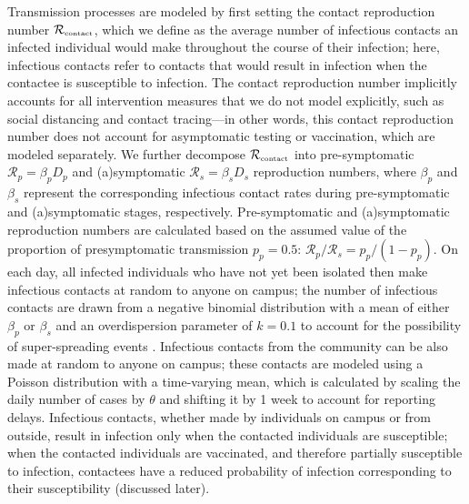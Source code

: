 \documentclass[12pt]{article}
\newcommand{\Rx}[1]{\ensuremath{{\mathcal R}_{#1}}}
\newcommand{\Rc}{\Rx{\textrm{\tiny{contact}}}}
\begin{document}
Transmission processes are modeled by first setting the contact reproduction number $\Rc$, which we define as the average number of infectious contacts an infected individual would make throughout the course of their infection;
here, infectious contacts refer to contacts that would result in infection when the contactee is susceptible to infection.
The contact reproduction number implicitly accounts for all intervention measures that we do not model explicitly, such as social distancing and contact tracing---in other words, this contact reproduction number does not account for asymptomatic testing or vaccination, which are modeled separately.
We further decompose $\Rc$ into pre-symptomatic $\mathcal R_p = \beta_p D_p$ and (a)symptomatic $\mathcal R_s = \beta_s D_s$ reproduction numbers, where $\beta_p$ and $\beta_s$ represent the corresponding infectious contact rates during pre-symptomatic and (a)symptomatic stages, respectively. Pre-symptomatic and (a)symptomatic reproduction numbers are calculated based on the assumed value of the proportion of presymptomatic transmission $p_p = 0.5$: $\mathcal R_p/\mathcal R_s = p_p/(1 - p_p)$.
On each day, all infected individuals who have not yet been isolated then make infectious contacts at random to anyone on campus; the number of infectious contacts are drawn from a negative binomial distribution with a mean of either $\beta_p$ or $\beta_s$ and an overdispersion parameter of $k=0.1$ to account for the possibility of super-spreading events \citep{10.12688/wellcomeopenres.15842.3}.
Infectious contacts from the community can be also made at random to anyone on campus; these contacts are modeled using a Poisson distribution with a time-varying mean, which is calculated by scaling the daily number of cases by $\theta$ and shifting it by 1 week to account for reporting delays.
Infectious contacts, whether made by individuals on campus or from outside, result in infection only when the contacted individuals are susceptible; when the contacted individuals are vaccinated, and therefore partially susceptible to infection, contactees have a reduced probability of infection corresponding to their susceptibility (discussed later).
\end{document}

